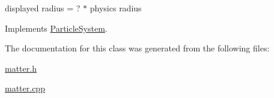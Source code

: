 displayed radius = ? $\ast$ physics radius 



Implements \hyperlink{classParticleSystem_a5b3bcfbc82de5d335f55173b049da517}{Particle\+System}.



The documentation for this class was generated from the following files\+:\begin{DoxyCompactItemize}
\item 
\hyperlink{matter_8h}{matter.\+h}\item 
\hyperlink{matter_8cpp}{matter.\+cpp}\end{DoxyCompactItemize}
